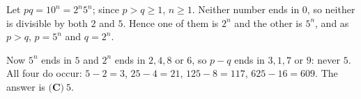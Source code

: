 Let $pq=10^n=2^n5^n$; since $p>q\ge1$, $n\ge1$. Neither number ends in $0$, so neither is divisible by both $2$ and $5$. Hence one of them is $2^n$ and the other is $5^n$, and as $p>q$, $p=5^n$ and $q=2^n$.

Now $5^n$ ends in $5$ and $2^n$ ends in $2,4,8$ or $6$, so $p-q$ ends in $3,1,7$ or $9$: never $5$. All four do occur: $5-2=3$, $25-4=21$, $125-8=117$, $625-16=609$. The answer is $\boxed{\textbf{(C)}\ 5}$.
